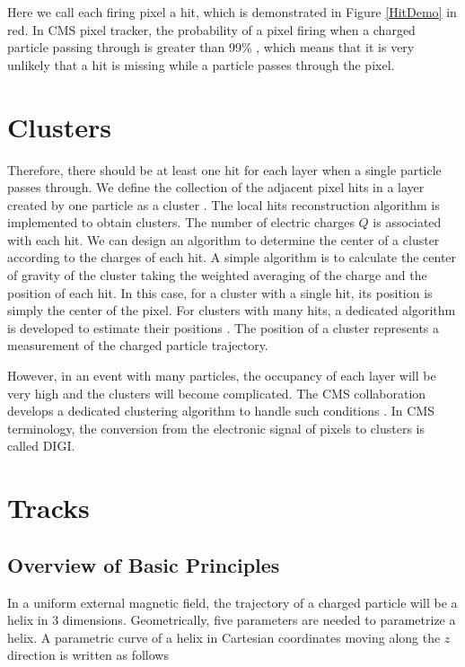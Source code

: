 Here we call each firing pixel a hit, which is demonstrated in Figure \ref{HitDemo} in red. In CMS pixel tracker, the probability of a pixel firing when a charged particle passing through is greater than 99\% \cite{CMSTrackComp}, which means that it is very unlikely that a hit is missing while a particle passes through the pixel. 



\section{Clusters}


Therefore, there should be at least one hit for each layer when a single particle passes through. We define the collection of the adjacent pixel hits in a layer created by one particle as a cluster \cite{CMSTrackComp}. The local hits reconstruction algorithm is implemented to obtain clusters. The number of electric charges $Q$ is associated with each hit. We can design an algorithm to determine the center of a cluster according to the charges of each hit. A simple algorithm is to calculate the center of gravity of the cluster taking the weighted averaging of the charge and the position of each hit. In this case, for a cluster with a single hit, its position is simply the center of the pixel. For clusters with many hits, a dedicated algorithm is developed to estimate their positions \cite{CMSTrackComp}. The position of a cluster represents a measurement of the charged particle trajectory. 

However, in an event with many particles, the occupancy of each layer will be very high and the clusters will become complicated. The CMS collaboration develops a dedicated clustering algorithm to handle such conditions \cite{ClusAlgo}. In CMS terminology, the conversion from the electronic signal of pixels to clusters is called DIGI.


\section{Tracks}

\subsection{Overview of Basic Principles}

In a uniform external magnetic field, the trajectory of a charged particle will be a helix in 3 dimensions. Geometrically, five parameters are needed to parametrize a helix. A parametric curve of a helix in Cartesian coordinates moving along the $z$ direction is written as follows

